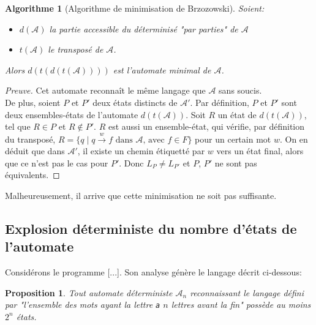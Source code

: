 \documentclass{article}
\newenvironment{preuve}{\begin{proof}[Preuve]}{\end{proof}}
\newtheorem{proposition}{Proposition}
\newtheorem{algo}{Algorithme}
\newenvironment{mdalgo}[1][]%
   {\begin{mdframed}[linecolor=black]\begin{algo}[#1]}
   {\end{algo}\end{mdframed}}
\begin{document}
\begin{mdalgo}[Algorithme de minimisation de Brzozowski] %
    Soient:
    \begin{itemize}[topsep=0pt, itemsep=0pt]
        \item $d(\mathcal{A})$ la partie accessible du déterminisé "par parties" de $\mathcal{A}$
        \item $t(\mathcal{A})$ le transposé de $\mathcal{A}$.
    \end{itemize} \hfill\break
    Alors $d(t(d(t(\mathcal{A}))))$ est l'automate minimal de $\mathcal{A}$.
\end{mdalgo}

\begin{preuve}
    Cet automate reconnaît le même langage que $\mathcal{A}$ sans soucis. \\
    De plus, soient $P$ et $P'$ deux états distincts de $\mathcal{A}'$.
    Par définition, $P$ et $P'$ sont deux ensembles-états de l'automate $d(t(\mathcal{A}))$.
    Soit $R$ un état de $d(t(\mathcal{A}))$, tel que $R \in P$ et $R \notin P'$. $R$ est aussi un ensemble-état, qui vérifie,
    par définition du transposé, $R = \{q \;|\; q \xrightarrow{w} f \text{ dans } \mathcal{A} \text{, avec } f \in F\}$ pour un certain mot $w$.
    On en déduit que dans $\mathcal{A'}$, il existe un chemin étiquetté par $w$ vers un état final,
    alors que ce n'est pas le cas pour $P'$. Donc $L_P \neq L_{P'}$ et $P$, $P'$ ne sont pas équivalents.
\end{preuve}


Malheureusement, il arrive que cette minimisation ne soit pas suffisante.


\subsection{Explosion déterministe du nombre d'états de l'automate}

Considérons le programme [...]. Son analyse génère le langage décrit ci-dessous:

\begin{proposition}
    Tout automate déterministe $\mathcal{A}_n$ reconnaissant le langage défini par "l'ensemble des mots ayant la lettre
    \emph{\texttt{a}} $n$ lettres avant la fin" possède au moins $2^n$ états.
\end{proposition}
\end{document}
